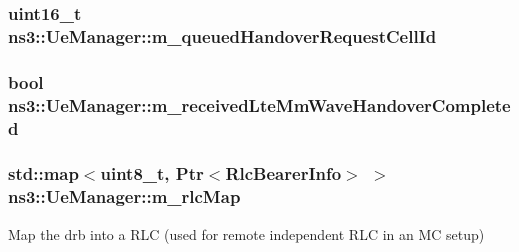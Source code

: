 \subsubsection[{\texorpdfstring{m\+\_\+queued\+Handover\+Request\+Cell\+Id}{m_queuedHandoverRequestCellId}}]{\setlength{\rightskip}{0pt plus 5cm}uint16\+\_\+t ns3\+::\+Ue\+Manager\+::m\+\_\+queued\+Handover\+Request\+Cell\+Id\hspace{0.3cm}{\ttfamily [private]}}\hypertarget{classns3_1_1UeManager_a70f73047c76f4fd1be2cc3665c381704}{}\label{classns3_1_1UeManager_a70f73047c76f4fd1be2cc3665c381704}
\subsubsection[{\texorpdfstring{m\+\_\+received\+Lte\+Mm\+Wave\+Handover\+Completed}{m_receivedLteMmWaveHandoverCompleted}}]{\setlength{\rightskip}{0pt plus 5cm}bool ns3\+::\+Ue\+Manager\+::m\+\_\+received\+Lte\+Mm\+Wave\+Handover\+Completed\hspace{0.3cm}{\ttfamily [private]}}\hypertarget{classns3_1_1UeManager_add440b9081bc11490fc5b7cf72c45115}{}\label{classns3_1_1UeManager_add440b9081bc11490fc5b7cf72c45115}
\subsubsection[{\texorpdfstring{m\+\_\+rlc\+Map}{m_rlcMap}}]{\setlength{\rightskip}{0pt plus 5cm}std\+::map$<$uint8\+\_\+t, {\bf Ptr}$<${\bf Rlc\+Bearer\+Info}$>$ $>$ ns3\+::\+Ue\+Manager\+::m\+\_\+rlc\+Map\hspace{0.3cm}{\ttfamily [private]}}\hypertarget{classns3_1_1UeManager_a64f37a901db7a322552ba08d87e65770}{}\label{classns3_1_1UeManager_a64f37a901db7a322552ba08d87e65770}
Map the drb into a R\+LC (used for remote independent R\+LC in an MC setup) 
